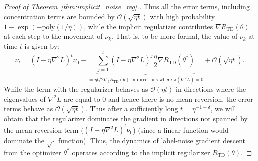 \begin{proof}[Proof of Theorem~\ref{thm:implicit_noise_reg}.]
Thus all the error terms, including concentration terms are bounded by $\mathcal{O}(\sqrt{\eta t})$ with high probability $1 - \exp(-\text{poly}(1/\eta))$, while the implicit regularizer contributes $\nabla R_\mathrm{TD}(\theta)$ at each step to the movement of $\nu_k$. That is, to be more formal, the value of $\nu_k$ at time $t$ is given by:
\begin{equation*}
    \nu_t = (I - \eta \nabla^2 L)^t \nu_0 - \underbrace{\sum_{j=1}^t (I - \eta \nabla^2 L)^j \frac{\eta}{2} \nabla R_\mathrm{TD}(\theta^*)}_{= \eta t/2 \nabla_\theta R_\mathrm{TD}(\theta) \text{~in directions where~} \lambda(\nabla^2 L) = 0} + \mathcal{O}(\sqrt{\eta t}).
\end{equation*}
While the term with the regularizer behaves as $\mathcal{O}(\eta t)$ in directions where the eigenvalues of $\nabla^2 L$ are equal to 0 and hence there is no mean-reversion, the error terms behave as $\mathcal{O}(\sqrt{\eta t})$. Thus after a sufficiently long $t = \eta^{-1 - \delta}$, we will obtain that the regularizer dominates the gradient in directions not spanned by the mean reversion term ($(I - \eta \nabla^2 L)^t \nu_0$) (since a linear function would dominate the $\sqrt{\cdot}$ function). Thus, the dynamics of label-noise gradient descent from the optimizer $\theta^*$ operates according to the implicit regularizer $R_\mathrm{TD}(\theta)$.
\end{proof}

